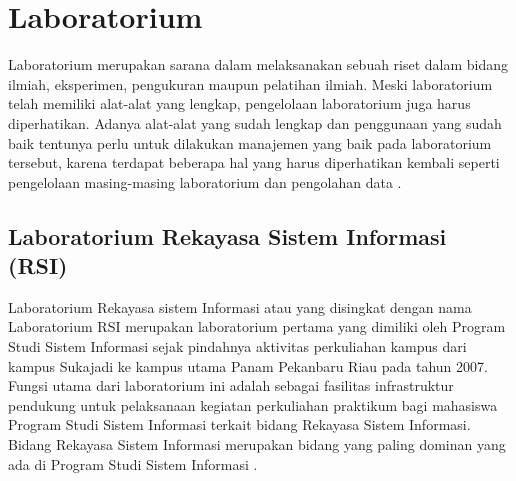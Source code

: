 \section{Laboratorium}
Laboratorium merupakan sarana dalam melaksanakan sebuah riset dalam bidang ilmiah, eksperimen, pengukuran maupun pelatihan ilmiah. Meski laboratorium telah memiliki alat-alat yang lengkap, pengelolaan laboratorium juga harus diperhatikan. Adanya alat-alat yang sudah lengkap dan penggunaan yang sudah baik tentunya perlu untuk dilakukan manajemen yang baik pada laboratorium tersebut, karena terdapat beberapa hal yang harus diperhatikan kembali seperti pengelolaan masing-masing laboratorium dan pengolahan data \cite{sweden2022rancang}.

\subsection{Laboratorium Rekayasa Sistem Informasi (RSI)}
Laboratorium Rekayasa sistem Informasi atau yang disingkat dengan nama Laboratorium RSI merupakan laboratorium pertama yang dimiliki oleh Program Studi Sistem Informasi sejak pindahnya aktivitas perkuliahan kampus dari kampus Sukajadi ke kampus utama Panam Pekanbaru Riau pada tahun 2007. Fungsi utama dari laboratorium ini adalah sebagai fasilitas infrastruktur pendukung untuk pelaksanaan kegiatan perkuliahan praktikum bagi mahasiswa Program Studi Sistem Informasi terkait bidang Rekayasa Sistem Informasi. Bidang Rekayasa Sistem Informasi merupakan bidang yang paling dominan yang ada di Program Studi Sistem Informasi \cite{lab-si-website}.


